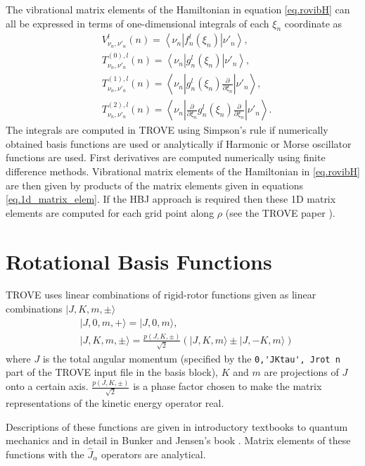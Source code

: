  The vibrational matrix elements of the Hamiltonian in equation \ref{eq.rovibH} can all be expressed in terms of 
 one-dimensional integrals of each $\xi_n$ coordinate as
 \begin{align}
 \label{eq.1d_matrix_elem}
& V_{\nu_n,\nu'_n}^l(n) = \left< \nu_n | f_n^l(\xi_n) | \nu'_n \right>,\\
& T^{(0),l}_{\nu_n,\nu'_n}(n) = \left< \nu_n | g_n^l(\xi_n) | \nu'_n \right>, \\ 
& T^{(1),l}_{\nu_n,\nu'_n}(n) = \left< \nu_n | g_n^l(\xi_n) \frac{\partial}{\partial \xi_n} | \nu'_n \right>,\\
& T^{(2),l}_{\nu_n,\nu'_n}(n) = \left< \nu_n | \frac{\partial}{\partial \xi_n} g_n^l(\xi_n) \frac{\partial}{\partial \xi_n} |
  \nu'_n \right>.
 \end{align}
The integrals are computed in TROVE using Simpson's rule if numerically obtained basis functions are used or 
analytically if Harmonic or Morse oscillator functions are used. First derivatives are computed numerically using finite 
difference methods. Vibrational matrix elements of the Hamiltonian in \ref{eq.rovibH} are then given by products of the
matrix elements given in equations \ref{eq.1d_matrix_elem}. If the HBJ approach is required then these 1D matrix elements
are computed for each grid point along $\rho$ (see the TROVE paper \cite{TROVE} ). 

\section{Rotational Basis Functions}
\label{sec.rot_basis}
TROVE uses linear combinations of rigid-rotor functions given as linear combinations $|J,K,m,\pm \rangle$
\begin{align}
\label{eq.rigid_rot}
&|J,0,m,+ \rangle = |J,0,m \rangle, \\
&|J,K,m,\pm \rangle = \frac{p(J,K,\pm)}{\sqrt{2}} \left(|J,K,m\rangle \pm |J,-K,m\rangle \right)
\end{align}
where $J$ is the total angular momentum (specified by the \verb|0,'JKtau', Jrot n| part of the TROVE input file in the 
basis block), $K$ and $m$ are projections of $J$ onto a certain axis. $\frac{p(J,K,\pm)}{\sqrt{2}}$ is a phase factor
chosen to make the matrix representations of the kinetic energy operator real. 

Descriptions of these functions are given in introductory textbooks to quantum mechanics \cite{11Atkins.book} and in detail in
Bunker and Jensen's book \cite{98BuJexx}. 
Matrix elements of these functions with the $\hat{J}_{\alpha}$ operators are analytical.


